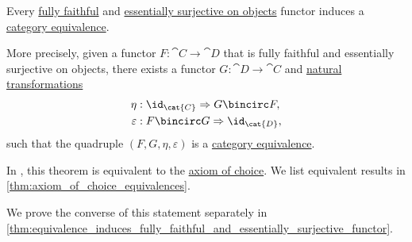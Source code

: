 \begin{theorem}\label{thm:fully_faithful_and_essentially_surjective_functor_induces_equivalence}
  Every \hyperref[def:functor_invertibility/fully_faithful]{fully faithful} and \hyperref[def:functor_invertibility/essentially_surjective]{essentially surjective on objects} functor induces a \hyperref[def:category_equivalence]{category equivalence}.

  More precisely, given a functor \( F: \cat{C} \to \cat{D} \) that is fully faithful and essentially surjective on objects, there exists a functor \( G: \cat{D} \to \cat{C} \) and \hyperref[def:natural_transformation]{natural transformations}
  \begin{align*}
    \eta        &: \id_{\cat{C}} \Rightarrow G \bincirc F, \\
    \varepsilon &: F \bincirc G \Rightarrow \id_{\cat{D}},
  \end{align*}
  such that the quadruple \( (F, G, \eta, \varepsilon) \) is a \hyperref[def:category_equivalence]{category equivalence}.

  In \hyperref[def:zfc]{}, this theorem is equivalent to the \hyperref[def:zfc/choice]{axiom of choice}. We list equivalent results in \cref{thm:axiom_of_choice_equivalences}.

  We prove the converse of this statement separately in \cref{thm:equivalence_induces_fully_faithful_and_essentially_surjective_functor}.
\end{theorem}
